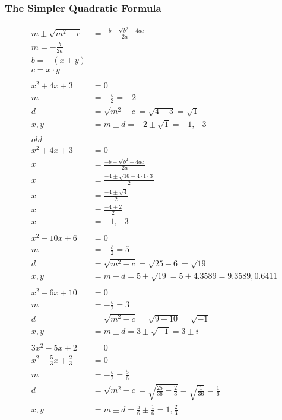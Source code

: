 \documentclass{article}
\begin{document}
\subsubsection{The Simpler Quadratic Formula}
\begin{align*}
    m \pm \sqrt{m^2 - c} &= \frac{-b \pm \sqrt{b^2 - 4ac}}{2a} \\
    m = -\frac{b}{2a} \\
    b = - (x + y) \\
    c = x \cdot y \\
    \\
    x^2+4x+3 &= 0 \\
    m &= -\frac{b}{2} = -2 \\
    d &= \sqrt{m^2 - c} = \sqrt{4 - 3} = \sqrt{1} \\
    x,y &= m \pm d = -2 \pm \sqrt{1} = -1, -3 \\
    \\
    old \\
    x^2+4x+3 &= 0 \\
    x &= \frac{-b \pm \sqrt{b^2 - 4ac}}{2a} \\
    x &= \frac{-4 \pm \sqrt{16 - 4 \cdot 1 \cdot 3}}{2} \\
    x &= \frac{-4 \pm \sqrt{4}}{2} \\
    x &= \frac{-4 \pm 2}{2} \\
    x &= -1, -3 \\
    \\
    x^2-10x+6 &= 0 \\
    m &= -\frac{b}{2} = 5 \\
    d &= \sqrt{m^2 - c} = \sqrt{25 - 6} = \sqrt{19} \\
    x,y &= m \pm d = 5 \pm \sqrt{19} = 5 \pm 4.3589 = 9.3589, 0.6411 \\
    \\
    x^2-6x+10 &= 0 \\
    m &= -\frac{b}{2} = 3 \\
    d &= \sqrt{m^2 - c} = \sqrt{9 - 10} = \sqrt{-1} \\
    x,y &= m \pm d = 3 \pm \sqrt{-1} = 3 \pm i \\
    \\
    3x^2-5x+2 &= 0 \\
    x^2 - \frac{5}{3}x + \frac{2}{3} &= 0 \\
    m &= -\frac{b}{2} = \frac{5}{6} \\
    d &= \sqrt{m^2 - c} = \sqrt{\frac{25}{36} - \frac{2}{3}} = \sqrt{\frac{1}{36}} = \frac{1}{6} \\
    x,y &= m \pm d = \frac{5}{6} \pm \frac{1}{6} = 1, \frac{2}{3} \\
\end{align*}
\end{document}
